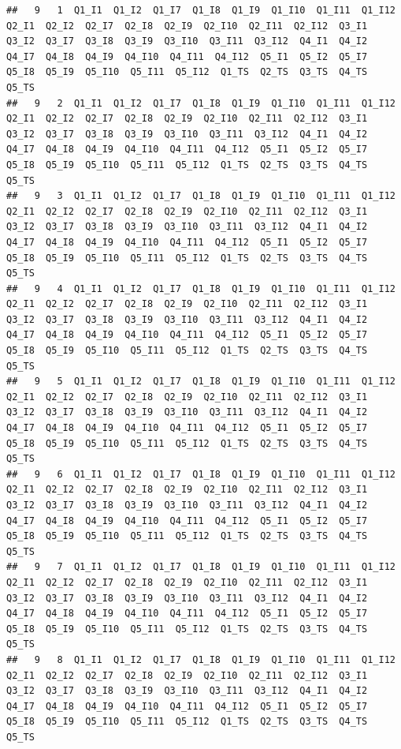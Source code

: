 \documentclass[
]{book}
\begin{document}
\begin{verbatim}
##   9   1  Q1_I1  Q1_I2  Q1_I7  Q1_I8  Q1_I9  Q1_I10  Q1_I11  Q1_I12  Q2_I1  Q2_I2  Q2_I7  Q2_I8  Q2_I9  Q2_I10  Q2_I11  Q2_I12  Q3_I1  Q3_I2  Q3_I7  Q3_I8  Q3_I9  Q3_I10  Q3_I11  Q3_I12  Q4_I1  Q4_I2  Q4_I7  Q4_I8  Q4_I9  Q4_I10  Q4_I11  Q4_I12  Q5_I1  Q5_I2  Q5_I7  Q5_I8  Q5_I9  Q5_I10  Q5_I11  Q5_I12  Q1_TS  Q2_TS  Q3_TS  Q4_TS  Q5_TS
##   9   2  Q1_I1  Q1_I2  Q1_I7  Q1_I8  Q1_I9  Q1_I10  Q1_I11  Q1_I12  Q2_I1  Q2_I2  Q2_I7  Q2_I8  Q2_I9  Q2_I10  Q2_I11  Q2_I12  Q3_I1  Q3_I2  Q3_I7  Q3_I8  Q3_I9  Q3_I10  Q3_I11  Q3_I12  Q4_I1  Q4_I2  Q4_I7  Q4_I8  Q4_I9  Q4_I10  Q4_I11  Q4_I12  Q5_I1  Q5_I2  Q5_I7  Q5_I8  Q5_I9  Q5_I10  Q5_I11  Q5_I12  Q1_TS  Q2_TS  Q3_TS  Q4_TS  Q5_TS
##   9   3  Q1_I1  Q1_I2  Q1_I7  Q1_I8  Q1_I9  Q1_I10  Q1_I11  Q1_I12  Q2_I1  Q2_I2  Q2_I7  Q2_I8  Q2_I9  Q2_I10  Q2_I11  Q2_I12  Q3_I1  Q3_I2  Q3_I7  Q3_I8  Q3_I9  Q3_I10  Q3_I11  Q3_I12  Q4_I1  Q4_I2  Q4_I7  Q4_I8  Q4_I9  Q4_I10  Q4_I11  Q4_I12  Q5_I1  Q5_I2  Q5_I7  Q5_I8  Q5_I9  Q5_I10  Q5_I11  Q5_I12  Q1_TS  Q2_TS  Q3_TS  Q4_TS  Q5_TS
##   9   4  Q1_I1  Q1_I2  Q1_I7  Q1_I8  Q1_I9  Q1_I10  Q1_I11  Q1_I12  Q2_I1  Q2_I2  Q2_I7  Q2_I8  Q2_I9  Q2_I10  Q2_I11  Q2_I12  Q3_I1  Q3_I2  Q3_I7  Q3_I8  Q3_I9  Q3_I10  Q3_I11  Q3_I12  Q4_I1  Q4_I2  Q4_I7  Q4_I8  Q4_I9  Q4_I10  Q4_I11  Q4_I12  Q5_I1  Q5_I2  Q5_I7  Q5_I8  Q5_I9  Q5_I10  Q5_I11  Q5_I12  Q1_TS  Q2_TS  Q3_TS  Q4_TS  Q5_TS
##   9   5  Q1_I1  Q1_I2  Q1_I7  Q1_I8  Q1_I9  Q1_I10  Q1_I11  Q1_I12  Q2_I1  Q2_I2  Q2_I7  Q2_I8  Q2_I9  Q2_I10  Q2_I11  Q2_I12  Q3_I1  Q3_I2  Q3_I7  Q3_I8  Q3_I9  Q3_I10  Q3_I11  Q3_I12  Q4_I1  Q4_I2  Q4_I7  Q4_I8  Q4_I9  Q4_I10  Q4_I11  Q4_I12  Q5_I1  Q5_I2  Q5_I7  Q5_I8  Q5_I9  Q5_I10  Q5_I11  Q5_I12  Q1_TS  Q2_TS  Q3_TS  Q4_TS  Q5_TS
##   9   6  Q1_I1  Q1_I2  Q1_I7  Q1_I8  Q1_I9  Q1_I10  Q1_I11  Q1_I12  Q2_I1  Q2_I2  Q2_I7  Q2_I8  Q2_I9  Q2_I10  Q2_I11  Q2_I12  Q3_I1  Q3_I2  Q3_I7  Q3_I8  Q3_I9  Q3_I10  Q3_I11  Q3_I12  Q4_I1  Q4_I2  Q4_I7  Q4_I8  Q4_I9  Q4_I10  Q4_I11  Q4_I12  Q5_I1  Q5_I2  Q5_I7  Q5_I8  Q5_I9  Q5_I10  Q5_I11  Q5_I12  Q1_TS  Q2_TS  Q3_TS  Q4_TS  Q5_TS
##   9   7  Q1_I1  Q1_I2  Q1_I7  Q1_I8  Q1_I9  Q1_I10  Q1_I11  Q1_I12  Q2_I1  Q2_I2  Q2_I7  Q2_I8  Q2_I9  Q2_I10  Q2_I11  Q2_I12  Q3_I1  Q3_I2  Q3_I7  Q3_I8  Q3_I9  Q3_I10  Q3_I11  Q3_I12  Q4_I1  Q4_I2  Q4_I7  Q4_I8  Q4_I9  Q4_I10  Q4_I11  Q4_I12  Q5_I1  Q5_I2  Q5_I7  Q5_I8  Q5_I9  Q5_I10  Q5_I11  Q5_I12  Q1_TS  Q2_TS  Q3_TS  Q4_TS  Q5_TS
##   9   8  Q1_I1  Q1_I2  Q1_I7  Q1_I8  Q1_I9  Q1_I10  Q1_I11  Q1_I12  Q2_I1  Q2_I2  Q2_I7  Q2_I8  Q2_I9  Q2_I10  Q2_I11  Q2_I12  Q3_I1  Q3_I2  Q3_I7  Q3_I8  Q3_I9  Q3_I10  Q3_I11  Q3_I12  Q4_I1  Q4_I2  Q4_I7  Q4_I8  Q4_I9  Q4_I10  Q4_I11  Q4_I12  Q5_I1  Q5_I2  Q5_I7  Q5_I8  Q5_I9  Q5_I10  Q5_I11  Q5_I12  Q1_TS  Q2_TS  Q3_TS  Q4_TS  Q5_TS

\end{verbatim}
\end{document}
